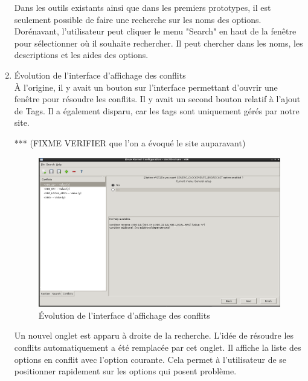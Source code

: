 \documentclass[16pts]{report}
\begin{document}
\begin{enumerate}
	Dans les outils existants ainsi que dans les premiers prototypes, il est seulement possible de faire une recherche sur les noms des options. 
	Dorénavant, l'utilisateur peut cliquer le menu "Search" en haut de la 
	fenêtre pour sélectionner où il souhaite rechercher. Il peut chercher dans 
	les noms, les descriptions et les aides des options.
	\\

	\pagebreak	

	\item Évolution de l'interface d'affichage des conflits
	\\

	À l'origine, il y avait un bouton sur l'interface permettant d'ouvrir 
	une fenêtre pour résoudre les conflits. Il y avait un second bouton relatif 
	à l'ajout de Tags. Il a également disparu, car les tags sont uniquement 
	gérés par notre site.  

	*** (FIXME VERIFIER que l'on a évoqué le site auparavant)

	\begin{figure}[H]
		\includegraphics[scale=0.5]{./illustrations/screen_options_conflits_interface.png}
		\centering
		\caption{Évolution de l'interface d'affichage des conflits}
		\label{fig:Evo_config}
	\end{figure}

	Un nouvel onglet est apparu à droite de la recherche. L'idée de résoudre 
	les conflits automatiquement a été remplacée par cet onglet. Il affiche 
	la liste des options en conflit avec l'option courante. Cela permet à 
	l'utilisateur de se positionner rapidement sur les options qui posent 
	problème. 
	\\
\end{enumerate}
\end{document}
